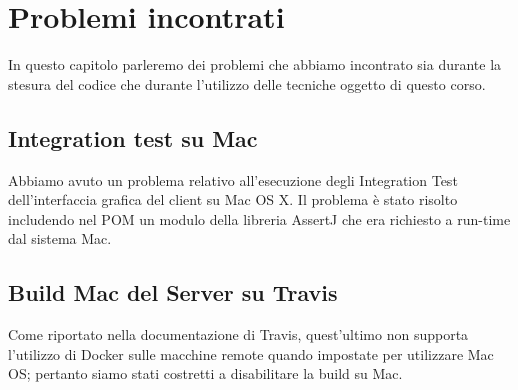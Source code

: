 \chapter{Problemi incontrati}
In questo capitolo parleremo dei problemi che abbiamo incontrato sia durante la stesura del codice che durante l'utilizzo delle tecniche oggetto di questo corso.
\section{Integration test su Mac}
Abbiamo avuto un problema relativo all'esecuzione degli Integration Test dell'interfaccia grafica del client su Mac OS X. Il problema \`e stato risolto includendo nel POM un modulo della libreria AssertJ che era richiesto a run-time dal sistema Mac.
\section{Build Mac del Server su Travis}
Come riportato nella documentazione di Travis, quest'ultimo non supporta l'utilizzo di Docker sulle macchine remote quando impostate per utilizzare Mac OS; pertanto siamo stati costretti a disabilitare la build su Mac.

